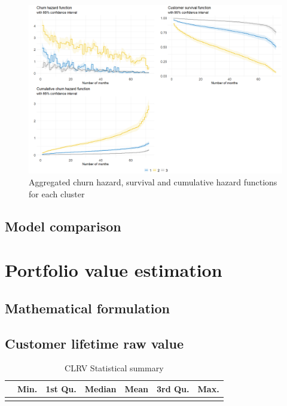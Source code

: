 \documentclass[
]{book}
\begin{document}
\begin{figure}

{\centering \includegraphics[width=20.83in]{./imgs/churn_surv_clust} 

}

\caption{Aggregated churn hazard, survival and cumulative hazard functions for each cluster}\label{fig:coxclust}
\end{figure}

\hypertarget{model-comparison}{%
\subsection{Model comparison}\label{model-comparison}}

\hypertarget{portfolio-value-estimation}{%
\section{Portfolio value estimation}\label{portfolio-value-estimation}}

\hypertarget{mathematical-formulation}{%
\subsection{Mathematical formulation}\label{mathematical-formulation}}

\hypertarget{customer-lifetime-raw-value}{%
\subsection{Customer lifetime raw value}\label{customer-lifetime-raw-value}}

\begin{table}[H]

\caption{\label{tab:custValues}CLRV Statistical summary}
\centering
\begin{tabular}[t]{lrrrrrr}
\toprule
  & Min. & 1st Qu. & Median & Mean & 3rd Qu. & Max.\\
\midrule
\cellcolor{gray!6}{} & \cellcolor{gray!6}{140.41} & \cellcolor{gray!6}{731.61} & \cellcolor{gray!6}{1411.27} & \cellcolor{gray!6}{2286.52} & \cellcolor{gray!6}{3752.24} & \cellcolor{gray!6}{6825.71}\\
\bottomrule
\end{tabular}
\end{table}
\end{document}
